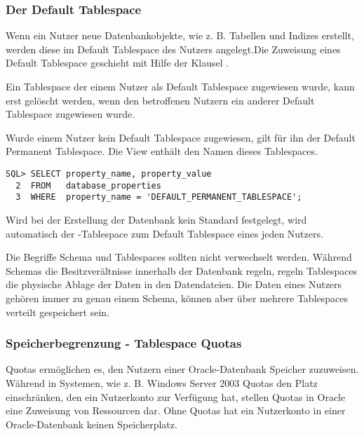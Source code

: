         \subsubsection{Der Default Tablespace}
          Wenn ein Nutzer neue Datenbankobjekte, wie z. B. Tabellen und Indizes erstellt, werden diese im Default Tablespace des Nutzers angelegt.Die Zuweisung eines Default Tablespace geschieht mit Hilfe der Klausel .
          \begin{merke}
            Ein Tablespace der einem Nutzer als Default Tablespace zugewiesen wurde, kann erst gelöscht werden, wenn den betroffenen Nutzern ein anderer Default Tablespace zugewiesen wurde.
          \end{merke}
\clearpage		  
          Wurde einem Nutzer kein Default Tablespace zugewiesen, gilt für ihn der Default Permanent Tablespace. Die View  enthält den Namen dieses Tablespaces.
          \begin{lstlisting}[caption={Der Default Permanent
          Tablespace},label=admin201,language=oracle_sql]
SQL> SELECT property_name, property_value
  2  FROM   database_properties
  3  WHERE  property_name = 'DEFAULT_PERMANENT_TABLESPACE';
          \end{lstlisting}
          \begin{merke}
            Wird bei der Erstellung der Datenbank kein Standard festgelegt, wird automatisch der -Tablespace zum Default Tablespace eines jeden Nutzers.
          \end{merke}
          Die Begriffe Schema und Tablespaces sollten nicht verwechselt werden. Während Schemas die Besitzverältnisse innerhalb der Datenbank regeln, regeln Tablespaces die physische Ablage der Daten in den Datendateien. Die Daten eines Nutzers gehören immer zu genau einem Schema, können aber über mehrere Tablespaces verteilt gespeichert sein.
        \subsubsection{Speicherbegrenzung - Tablespace Quotas}
          Quotas ermöglichen es, den Nutzern einer Oracle-Datenbank Speicher zuzuweisen. Während in Systemen, wie z. B. Windows Server 2003 Quotas den Platz einschränken, den ein Nutzerkonto zur Verfügung hat, stellen Quotas in Oracle eine Zuweisung von Ressourcen dar. Ohne Quotas hat ein Nutzerkonto in einer Oracle-Datenbank keinen Speicherplatz.


